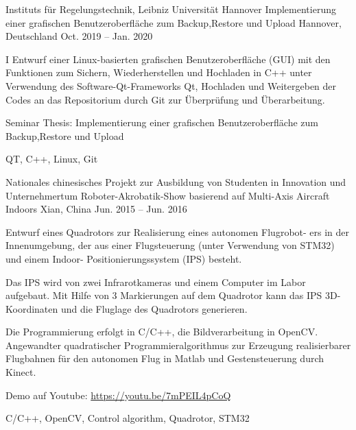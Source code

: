 

\begin{cventries}
\cventry
{Instituts für Regelungstechnik, Leibniz Universität Hannover} %
{Implementierung einer grafischen Benutzeroberfläche zum Backup,Restore und Upload} %
{Hannover, Deutschland} %
{Oct. 2019 – Jan. 2020} %
{
	\begin{cvitems} %
		\item {I Entwurf einer Linux-basierten grafischen Benutzeroberfläche (GUI) mit den Funktionen zum Sichern, Wiederherstellen und Hochladen in C++ unter Verwendung des Software-Qt-Frameworks Qt, Hochladen und Weitergeben der Codes an das Repositorium durch Git zur Überprüfung und Überarbeitung.}
		\item {Seminar Thesis: Implementierung einer grafischen Benutzeroberfläche zum Backup,Restore und Upload}
	\end{cvitems}
	}
{QT, C++, Linux, Git}

  \cventry
    {Nationales chinesisches Projekt zur Ausbildung von Studenten in Innovation und Unternehmertum} 
    {Roboter-Akrobatik-Show basierend auf Multi-Axis Aircraft Indoors}
    {Xian, China} %
    {Jun. 2015 – Jun. 2016} %
    {
      \begin{cvitems} %
        \item {Entwurf eines Quadrotors zur Realisierung eines autonomen Flugrobot- ers in der Innenumgebung, der aus einer Flugsteuerung (unter Verwendung von STM32) und einem Indoor- Positionierungssystem (IPS) besteht.}
        \item {Das IPS wird von zwei Infrarotkameras und einem Computer im Labor aufgebaut. Mit Hilfe von 3 Markierungen auf dem Quadrotor kann das IPS 3D-Koordinaten und die Fluglage des Quadrotors generieren.}
        \item {Die Programmierung erfolgt in C/C++, die Bildverarbeitung in OpenCV. Angewandter quadratischer Programmieralgorithmus zur Erzeugung realisierbarer Flugbahnen für den autonomen Flug in Matlab und Gestensteuerung durch Kinect.}
        \item {Demo auf Youtube:  \url{https://youtu.be/7mPEIL4pCoQ}}
      \end{cvitems}
    }
	{C/C++, OpenCV, Control algorithm, Quadrotor, STM32 }	


\end{cventries}
